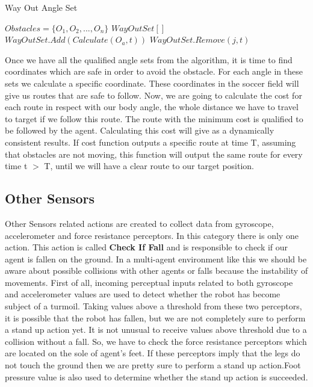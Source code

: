 \begin{algorithm}[htb!]
\caption{Way Out Angle Set}
\label{AngleSet}
\begin{algorithmic}[1]
$Obstacles = \lbrace O_{1},O_{2},...,O_{n} \rbrace $
$WayOutSet[]$
\STATE $WayOutSet.Add(Calculate(O_{a},t))$
\ENDFOR
{}
\STATE $WayOutSet.Remove(j,t)$
\ENDIF
\ENDFOR
\ENDFOR
\end{algorithmic}
\end{algorithm}
Once we have all the qualified angle sets from the algorithm, it is time to find coordinates which are safe in order to avoid the obstacle. For each angle in these sets we calculate a specific coordinate. These coordinates in the soccer field will give us routes that are safe to follow. Now, we are going to calculate the cost for each route in respect with our body angle, the whole distance we have to travel to target if we follow this route. The route with the minimum cost is qualified to be followed by the agent. Calculating this cost will give as a dynamically consistent results. If cost function outputs a specific route at time T, assuming that obstacles are not moving, this function will output the same route for every time t $>$ T, until we will have a clear route to our target position.


\subsection{Other Sensors}
Other Sensors related actions are created to collect data from gyroscope, accelerometer and force resistance perceptors. In this category there is only one action. This action is called {\bf Check If Fall} and is responsible to check if our agent is fallen on the ground. In a multi-agent environment like this we should be aware about possible collisions with other agents or falls because the instability of movements. First of all, incoming perceptual inputs related to both gyroscope and accelerometer values are used to detect whether the robot has become subject of a turmoil. Taking values  above a threshold from these two perceptors, it is possible that the robot has fallen, but we are not completely sure to perform a stand up action yet. It is not unusual to receive values above threshold due to a collision without a fall. So, we have to check the force resistance perceptors which are located on the sole of agent's feet. If these perceptors imply that the legs do not touch the ground then we are pretty sure to perform a stand up action.Foot pressure value is also used to determine whether the stand up action is succeeded.


